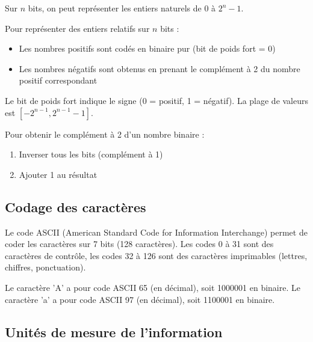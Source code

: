 \begin{definition}
Sur $n$ bits, on peut représenter les entiers naturels de $0$ à $2^n - 1$.
\end{definition}

\begin{definition}[Complément à 2]
Pour représenter des entiers relatifs sur $n$ bits :
\begin{itemize}
    \item Les nombres positifs sont codés en binaire pur (bit de poids fort = 0)
    \item Les nombres négatifs sont obtenus en prenant le complément à 2 du nombre positif correspondant
\end{itemize}
Le bit de poids fort indique le signe (0 = positif, 1 = négatif). La plage de valeurs est $[-2^{n-1}, 2^{n-1}-1]$.
\end{definition}

\begin{aretenir}
Pour obtenir le complément à 2 d'un nombre binaire :
\begin{enumerate}
    \item Inverser tous les bits (complément à 1)
    \item Ajouter 1 au résultat
\end{enumerate}
\end{aretenir}

\subsection{Codage des caractères}

\begin{definition}
Le code ASCII (American Standard Code for Information Interchange) permet de coder les caractères sur 7 bits (128 caractères). Les codes 0 à 31 sont des caractères de contrôle, les codes 32 à 126 sont des caractères imprimables (lettres, chiffres, ponctuation).
\end{definition}

\begin{exemple}
Le caractère 'A' a pour code ASCII 65 (en décimal), soit 1000001 en binaire.
Le caractère 'a' a pour code ASCII 97 (en décimal), soit 1100001 en binaire.
\end{exemple}

\subsection{Unités de mesure de l'information}

